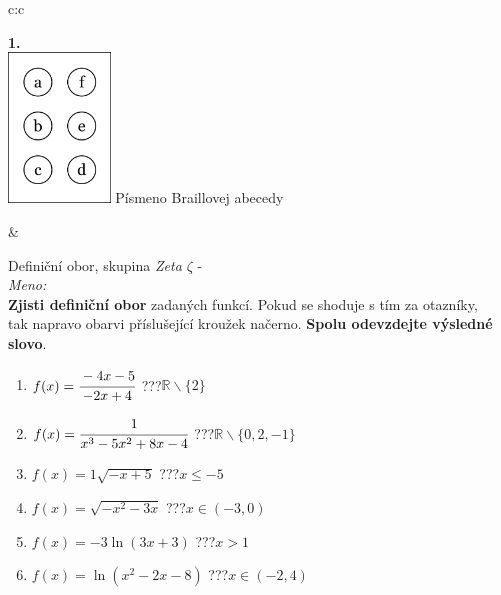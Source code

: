 \documentclass[10pt]{report}
\begin{document}
\begin{tabular}{c:c}
\begin{minipage}[c][99mm][t]{0.49\linewidth}
\begin{center}
\begin{minipage}{0.20\linewidth}
\begin{center}
{\Huge\bfseries 1.} \\[2mm]
\includegraphics[height=40mm]{../images/braille.png}
{\small Písmeno Braillovej abecedy}
\end{center}
\end{minipage}
\end{center}
\end{minipage}
&
\begin{minipage}[c][99mm][t]{0.49\linewidth}
\begin{center}
\vspace{7mm}
{\huge Definiční obor, skupina \textit{Zeta $\zeta$} -}\\[4.5mm]
\textit{Meno:}\phantom{xxxxxxxxxxxxxxxxxxxxxxxxxxxxxxxxxxxxxxxxxxxxxxxxxxxxxxxxxxxxxxxxx}\\[3.5mm]
\textbf{Zjisti definiční obor} zadaných funkcí. Pokud se shoduje s tím za otazníky,\\tak napravo obarvi příslušející kroužek načerno. \textbf{Spolu odevzdejte výsledné slovo}.\\[3mm]
\begin{minipage}{0.77\linewidth}
\begin{center}
\begin{varwidth}{\textwidth}
\begin{enumerate}
\normalsize
\item $f(x)=\cfrac{-4x-5}{-2x+4}$\quad \dotfill\; ???\;\dotfill \quad $\mathbb{R}\smallsetminus\{2\}$
\item $f(x)=\cfrac{1}{x^3-5x^2+8x-4}$\quad \dotfill\; ???\;\dotfill \quad $\mathbb{R}\smallsetminus\{0,2,-1\}$
\item $f(x)=1\sqrt{-x+5}$\quad \dotfill\; ???\;\dotfill \quad $x\leq-5$
\item $f(x)=\sqrt{-x^2-3x}$\quad \dotfill\; ???\;\dotfill \quad $x\in(-3 , 0)$
\item $f(x)=-3\ln{(3x+3)}$\quad \dotfill\; ???\;\dotfill \quad $x>1$
\item $f(x)=\ln{(x^2-2x-8)}$\quad \dotfill\; ???\;\dotfill \quad $x\in(-2 , 4)$
\end{enumerate}

\end{varwidth}
\end{center}
\end{minipage}
\end{center}
\end{minipage}
\end{tabular}
\end{document}
